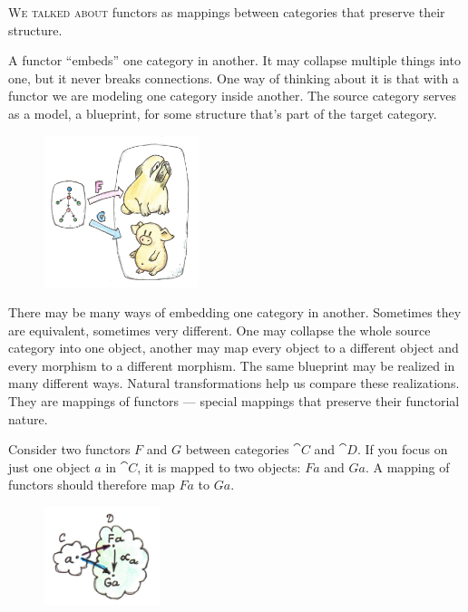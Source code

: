 
\lettrine[lhang=0.17]{W}{e talked about} functors as mappings between categories that preserve
their structure.

A functor ``embeds'' one category in another. It may
collapse multiple things into one, but it never breaks connections. One
way of thinking about it is that with a functor we are modeling one
category inside another. The source category serves as a model, a
blueprint, for some structure that's part of the target category.

\begin{figure}[H]
\centering\includegraphics[width=0.4\textwidth]{images/1_functors.jpg}
\end{figure}

\noindent
There may be many ways of embedding one category in another. Sometimes
they are equivalent, sometimes very different. One may collapse the
whole source category into one object, another may map every object to a
different object and every morphism to a different morphism. The same
blueprint may be realized in many different ways. Natural
transformations help us compare these realizations. They are mappings of
functors --- special mappings that preserve their functorial nature.

Consider two functors $F$ and $G$ between categories
$\cat{C}$ and $\cat{D}$. If you focus on just one object $a$ in
$\cat{C}$, it is mapped to two objects: $F a$ and $G a$.
A mapping of functors should therefore map $F a$ to
$G a$.

\begin{figure}[H]
\centering
\includegraphics[width=0.3\textwidth]{images/2_natcomp.jpg}
\end{figure}

